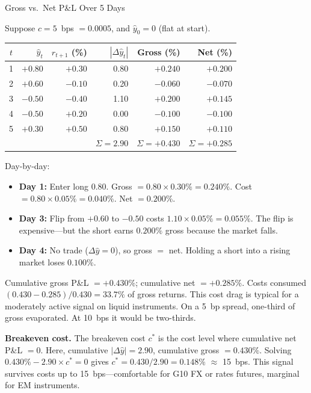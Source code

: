 \begin{workedexample}{Gross vs.\ Net P\&L Over 5 Days}

Suppose $c = 5$~bps $= 0.0005$, and $\hat{y}_0 = 0$ (flat at start).

\begin{center}
\begin{tabular}{crrrrr}
\toprule
$t$ & $\hat{y}_t$ & $r_{t+1}$ (\%) & $|\Delta \hat{y}_t|$ & Gross (\%) & Net (\%) \\
\midrule
1 & $+0.80$ & $+0.30$ & 0.80 & $+0.240$ & $+0.200$ \\
2 & $+0.60$ & $-0.10$ & 0.20 & $-0.060$ & $-0.070$ \\
3 & $-0.50$ & $-0.40$ & 1.10 & $+0.200$ & $+0.145$ \\
4 & $-0.50$ &  $+0.20$ & 0.00 & $-0.100$ & $-0.100$ \\
5 & $+0.30$ & $+0.50$ & 0.80 & $+0.150$ & $+0.110$ \\
\midrule
  & & & $\Sigma = 2.90$ & $\Sigma = +0.430$ & $\Sigma = +0.285$ \\
\bottomrule
\end{tabular}
\end{center}

Day-by-day:
\begin{itemize}[nosep]
  \item \textbf{Day 1:} Enter long $0.80$. Gross $= 0.80 \times 0.30\% = 0.240\%$. Cost $= 0.80 \times 0.05\% = 0.040\%$. Net $= 0.200\%$.
  \item \textbf{Day 3:} Flip from $+0.60$ to $-0.50$ costs $1.10 \times 0.05\% = 0.055\%$. The flip is expensive---but the short earns $0.200\%$ gross because the market falls.
  \item \textbf{Day 4:} No trade ($\Delta \hat{y} = 0$), so gross $=$ net. Holding a short into a rising market loses $0.100\%$.
\end{itemize}

Cumulative gross P\&L $= +0.430\%$; cumulative net $= +0.285\%$.  Costs consumed $(0.430 - 0.285)/0.430 = 33.7\%$ of gross returns.  This cost drag is typical for a moderately active signal on liquid instruments.  On a 5~bp spread, one-third of gross evaporated.  At 10~bps it would be two-thirds.

\textbf{Breakeven cost.}  The breakeven cost $c^*$ is the cost level where cumulative net P\&L $= 0$.  Here, cumulative $|\Delta\hat{y}| = 2.90$, cumulative gross $= 0.430\%$.  Solving $0.430\% - 2.90 \times c^* = 0$ gives $c^* = 0.430/2.90 = 0.148\%$ $\approx$ 15~bps.  This signal survives costs up to 15~bps---comfortable for G10 FX or rates futures, marginal for EM instruments.
\end{workedexample}


